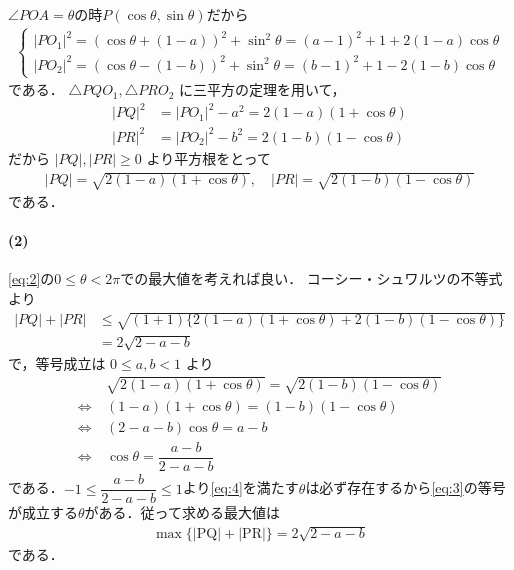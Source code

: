 \documentclass[../../main.tex]{subfiles}
\begin{document}
$\angle POA=\theta$の時$P(\cos\theta,\sin\theta)$だから
\begin{align}
  \begin{cases}
    |PO_1|^2 = (\cos\theta+(1-a))^2 + \sin^2\theta = (a-1)^2+1+2(1-a)\cos\theta \\
    |PO_2|^2 = (\cos\theta-(1-b))^2 + \sin^2\theta = (b-1)^2+1-2(1-b)\cos\theta
  \end{cases}
\end{align}
である．
$\triangle PQO_1, \triangle PRO_2$ に三平方の定理を用いて，
\begin{align}
  |PQ|^2 &= |PO_1|^2 - a^2 = 2(1-a)(1+\cos\theta) \\
  |PR|^2 &= |PO_2|^2 - b^2 = 2(1-b)(1-\cos\theta)
\end{align}
だから $|PQ|, |PR| \ge 0$ より平方根をとって
\begin{align}
  |PQ| = \sqrt{2(1-a)(1+\cos\theta)}, \quad
  |PR| = \sqrt{2(1-b)(1-\cos\theta)} \label{eq:2}
\end{align}
である．

\paragraph{(2)}

\cref{eq:2}の$0 \le \theta < 2\pi$での最大値を考えれば良い．
コーシー・シュワルツの不等式より
\begin{align}
  |PQ|+|PR|
  &\le \sqrt{(1+1)\{2(1-a)(1+\cos\theta) + 2(1-b)(1-\cos\theta)\}} \\
  &= 2\sqrt{2-a-b} \label{eq:3}
\end{align}
で，等号成立は $0 \le a, b < 1$ より
\begin{align}
  &\sqrt{2(1-a)(1+\cos\theta)} = \sqrt{2(1-b)(1-\cos\theta)} \\
  \Leftrightarrow\ & (1-a)(1+\cos\theta) = (1-b)(1-\cos\theta) \\
  \Leftrightarrow\ & (2-a-b)\cos\theta = a-b \\
  \Leftrightarrow\ & \cos\theta = \dfrac{a-b}{2-a-b} \label{eq:4}
\end{align}
である．$-1 \le \dfrac{a-b}{2-a-b} \le 1$より\cref{eq:4}を満たす$\theta$は必ず存在するから\cref{eq:3}の等号が成立する$\theta$がある．従って求める最大値は
\begin{align}
  \max\{|\text{PQ}|+|\text{PR}|\} = 2\sqrt{2-a-b}
\end{align}
である．
\end{document}
